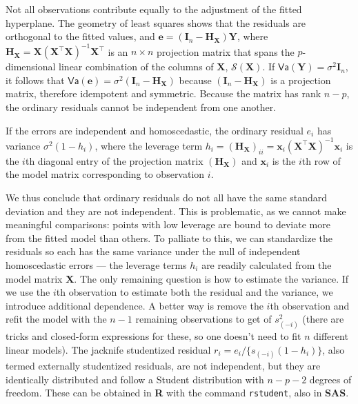 \documentclass[
  11pt,
  letterpaper,
]{book}
\theoremstyle{definition}
\theoremstyle{definition}
\theoremstyle{definition}
\theoremstyle{definition}
\theoremstyle{remark}
\begin{document}
Not all observations contribute equally to the adjustment of the fitted hyperplane. The geometry of least squares shows that the residuals are orthogonal to the fitted values, and \(\boldsymbol{e} = (\mathbf{I}_n-\mathbf{H}_{\mathbf{X}})\boldsymbol{Y}\), where \(\mathbf{H}_{\mathbf{X}}=\mathbf{X}(\mathbf{X}^\top\mathbf{X})^{-1}\mathbf{X}^\top\) is an \(n \times n\) projection matrix that spans the \(p\)-dimensional linear combination of the columns of \(\mathbf{X}\), \(\mathcal{S}(\mathbf{X})\). If \(\mathsf{Va}(\boldsymbol{Y}) = \sigma^2\mathbf{I}_n\), it follows that \(\mathsf{Va}(\boldsymbol{e})=\sigma^2(\mathbf{I}_n-\mathbf{H}_{\mathbf{X}})\) because \((\mathbf{I}_n-\mathbf{H}_{\mathbf{X}})\) is a projection matrix, therefore idempotent and symmetric. Because the matrix has rank \(n-p\), the ordinary residuals cannot be independent from one another.

If the errors are independent and homoscedastic, the ordinary residual \(e_i\) has variance \(\sigma^2(1-h_{i})\), where the leverage term \(h_i =(\mathbf{H}_{\mathbf{X}})_{ii} = \mathbf{x}_i (\mathbf{X}^\top\mathbf{X})^{-1}\mathbf{x}_i\) is the \(i\)th diagonal entry of the projection matrix \((\mathbf{H}_{\mathbf{X}})\) and \(\mathbf{x}_i\) is the \(i\)th row of the model matrix corresponding to observation \(i\).

We thus conclude that ordinary residuals do not all have the same standard deviation and they are not independent. This is problematic, as we cannot make meaningful comparisons: points with low leverage are bound to deviate more from the fitted model than others. To palliate to this, we can standardize the residuals so each has the same variance under the null of independent homoscedastic errors --- the leverage terms \(h_i\) are readily calculated from the model matrix \(\mathbf{X}\).
The only remaining question is how to estimate the variance. If we use the \(i\)th observation to estimate both the residual and the variance, we introduce additional dependence. A better way is remove the \(i\)th observation and refit the model with the \(n-1\) remaining observations to get of \(s^2_{(-i)}\) (there are tricks and closed-form expressions for these, so one doesn't need to fit \(n\) different linear models). The jacknife studentized residual \(r_i = e_i/\{s_{(-i)}(1-h_i)\}\), also termed externally studentized residuals, are not independent, but they are identically distributed and follow a Student distribution with \(n-p-2\) degrees of freedom.
These can be obtained in \textbf{R} with the command \texttt{rstudent}, also in \textbf{SAS}.
\end{document}
